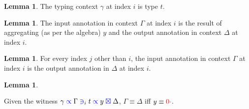 \documentclass[a4paper,UKenglish,cleveref, autoref, thm-restate,authorcolumns]{lipics-v2019}
\theoremstyle{definition}
\newtheorem{nilemma}[theorem]{Lemma}
\newcommand{\type}[1]{\textcolor{blue}{\operatorname{#1}}}
\newcommand{\field}[1]{\textcolor{red}{\operatorname{#1}}}
\newcommand{\zero}{\field{0\cdot}}
\newcommand{\contains}[6]{#1 \; \type{\propto} \; #2 \; \type{\ni}_{#3} \; #4 \; \type{\propto} \; #5 \; \type{\boxtimes} \; #6}
\begin{document}
\begin{example}
\end{example}

\begin{nilemma}
  The typing context $\gamma$ at index $i$ is type $t$.
\end{nilemma}
\begin{nilemma}
  The input annotation in context $\Gamma$ at index $i$ is the result of aggregating (as per the algebra) $y$ and the output annotation in context $\Delta$ at index $i$.
\end{nilemma}
\begin{nilemma}
  For every index $j$ other than $i$, the input annotation in context $\Gamma$ at index $i$ is the output annotation in $\Delta$ at index $i$.
\end{nilemma}
\begin{nilemma}
\end{nilemma}
\begin{corollary}
  Given the witness $\contains{\gamma}{\Gamma}{i}{t}{y}{\Delta}$, $\Gamma \equiv \Delta$ iff $y \equiv \zero$.
\end{corollary}
\end{document}
